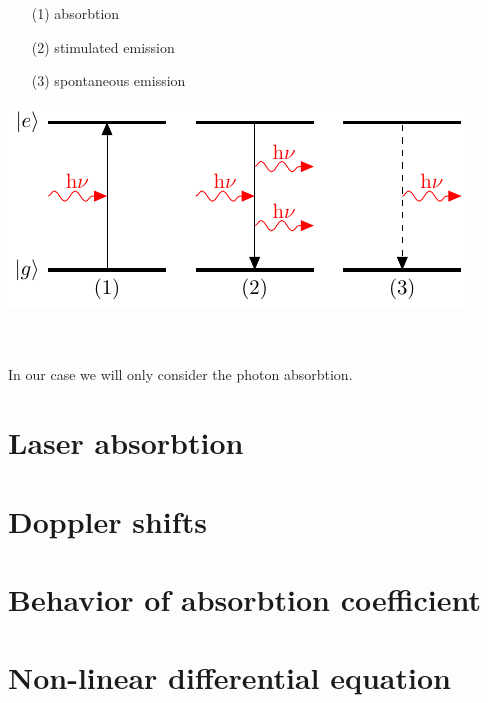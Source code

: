 \begin{minipage}[c][][c]{.35\textwidth}
\begin{itemize}
\item[(1)] absorbtion
\item[(2)] stimulated emission
\item[(3)] spontaneous emission
\end{itemize}
\end{minipage}
\hfill
\begin{minipage}[c]{.55\textwidth}
\includegraphics[width=\textwidth]{twolevel}
\end{minipage} \\ \\


In our case we will only consider the photon absorbtion. 

\pagebreak
\section{Laser absorbtion}  %

\pagebreak
\section{Doppler shifts}  %

\pagebreak
\section{Behavior of absorbtion coefficient}  %

\pagebreak
\section{Non-linear differential equation}  %

\pagebreak